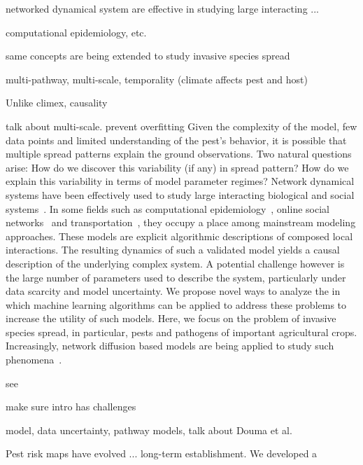 \documentclass[11pt]{article}
\theoremstyle{definition}
\begin{document}
networked dynamical system are effective in studying large interacting ...

computational epidemiology, etc.

same concepts are being extended to study invasive species spread

multi-pathway, multi-scale, temporality (climate affects pest and host)

Unlike climex, causality

talk about multi-scale. prevent overfitting
Given the complexity of the model, few data points and limited
understanding of the pest's behavior, it is possible that multiple spread
patterns explain the ground observations. Two natural questions arise: How
do we discover this variability (if any) in spread pattern? How do we
explain this variability in terms of model parameter regimes? 
Network dynamical systems have been effectively used to study large
interacting biological and social systems~\cite{}. In
some fields such as computational epidemiology~\cite{eubank2004modelling},
online social networks~\cite{guille2013information} and
transportation~\cite{transims}, they occupy a place among mainstream
modeling approaches.  These models are explicit algorithmic descriptions of
composed local interactions. The resulting dynamics of such a validated
model yields a causal description of the underlying complex system. A
potential challenge however is the large number of parameters used to
describe the system, particularly under data scarcity and model
uncertainty.  We propose novel ways to analyze the in which machine
learning algorithms can be applied to address these problems to increase
the utility of such models.  Here, we focus on the problem of invasive
species spread, in particular, pests and pathogens of important
agricultural crops.  Increasingly, network diffusion based models are being
applied to study such
phenomena~\cite{carrasco2010unveiling,nopsa2015ecological}.

see \cite{jordan2019modeling}


make sure intro has challenges

model, data uncertainty, pathway models, talk about Douma et al.

Pest risk maps have evolved ... long-term establishment. 
 We developed a 
\end{document}

